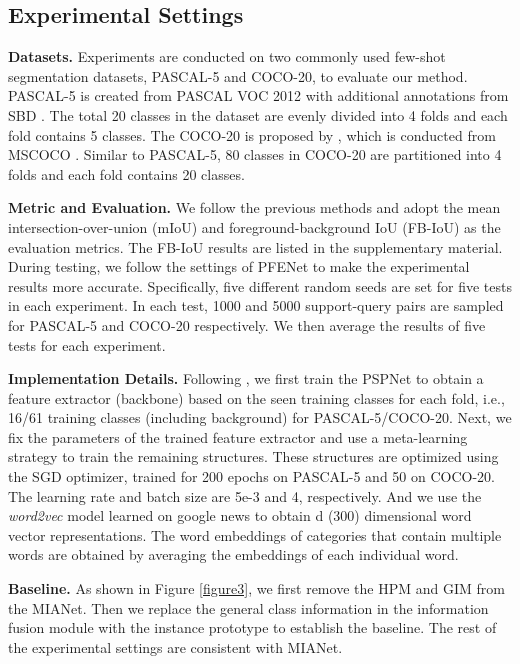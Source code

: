\documentclass[10pt,twocolumn,letterpaper]{article}
\begin{document}
\subsection{ Experimental Settings}
\noindent\textbf{Datasets.} Experiments are conducted on two commonly used few-shot segmentation datasets, PASCAL-5 and COCO-20, to evaluate our method. PASCAL-5 is created from PASCAL VOC 2012 \cite{PASCAL} with additional annotations from SBD \cite{sbd}. The total 20 classes in the dataset are evenly divided into 4 folds  and each fold contains 5 classes. The COCO-20 is proposed by \cite{fwb}, which is conducted from MSCOCO \cite{COCO}. Similar to PASCAL-5, 80 classes in COCO-20 are partitioned into 4 folds and each fold contains 20 classes.\par


\noindent\textbf{Metric and Evaluation.} We follow the previous methods and adopt the mean intersection-over-union (mIoU) and foreground-background IoU (FB-IoU) as the evaluation metrics. The FB-IoU results are listed in the supplementary material. During testing, we follow the settings of PFENet to make the experimental results more accurate. Specifically, five different random seeds are set for five tests in each experiment. In each test, 1000 and 5000 support-query pairs are sampled for PASCAL-5 and COCO-20 respectively. We then average the results of five tests for each experiment. \par


\noindent\textbf{Implementation Details.} Following \cite{bam,cwt}, we first train the PSPNet \cite{ppnet} to obtain a feature extractor (backbone) based on the seen training classes for each fold, i.e., 16/61 training classes (including background) for PASCAL-5/COCO-20. Next, we fix the parameters of the trained feature extractor and use a meta-learning strategy to train the remaining structures. These structures are optimized using the SGD optimizer, trained for 200 epochs on PASCAL-5 and 50 on COCO-20. The learning rate and batch size are 5e-3 and 4, respectively. And we use the \textit{word2vec} model learned on google news to obtain d (300) dimensional word vector representations. The word embeddings of categories that contain multiple words are obtained by averaging the embeddings of each individual word. \par

\noindent\textbf{Baseline.} As shown in Figure \ref{figure3}, we first remove the HPM and GIM from the MIANet. Then we replace the general class information  in the information fusion module with the instance prototype  to establish the baseline. The rest of the experimental settings are consistent with MIANet.
\end{document}

